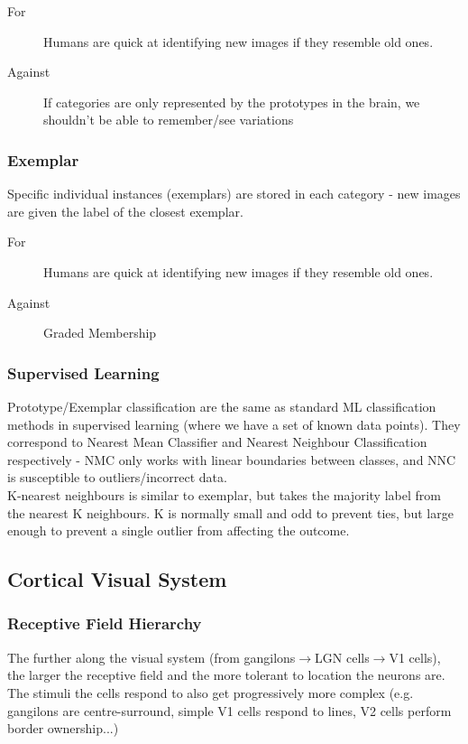 \begin{description}
    \item[For] Humans are quick at identifying new images if they resemble old ones. 
    \item[Against] If categories are only represented by the prototypes in the brain, we shouldn't be able to remember/see variations
\end{description}

\subsubsection{Exemplar}
Specific individual instances (exemplars) are stored in each category - new  images are given the label of the closest exemplar. 
\begin{description}
    \item[For] Humans are quick at identifying new images if they resemble old ones. 
    \item[Against] Graded Membership 
\end{description}

\subsubsection{Supervised Learning}
Prototype/Exemplar classification are the same as standard ML classification methods in supervised learning (where we have a set of known data points). They correspond to Nearest Mean Classifier and Nearest Neighbour Classification respectively - NMC only works with linear boundaries between classes, and NNC is susceptible to outliers/incorrect data. \\

K-nearest neighbours is similar to exemplar, but takes the majority label from the nearest K neighbours. K is normally small and odd to prevent ties, but large enough to prevent a single outlier from affecting the outcome.

\subsection{Cortical Visual System}

\subsubsection{Receptive Field Hierarchy}
The further along the visual system (from gangilons$\rightarrow$LGN cells$\rightarrow$V1 cells), the larger the receptive field and the more tolerant to location the neurons are. The stimuli the cells respond to also get progressively more complex (e.g. gangilons are centre-surround, simple V1 cells respond to lines, V2 cells perform border ownership...)

